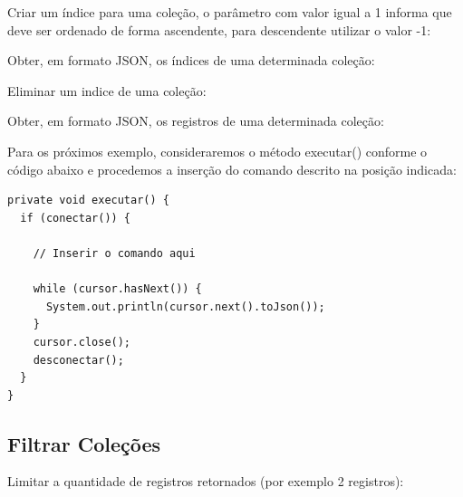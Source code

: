 \documentclass[a4paper,11pt]{article}
\begin{document}
Criar um índice para uma coleção, o parâmetro com valor igual a 1 informa que deve ser ordenado de forma ascendente, para descendente utilizar o valor -1: \\

Obter, em formato JSON, os índices de uma determinada coleção: \\

Eliminar um indice de uma coleção: \\

Obter, em formato JSON, os registros de uma determinada coleção: \\

Para os próximos exemplo, consideraremos o método executar() conforme o código abaixo e procedemos a inserção do comando descrito na posição indicada:
\begin{lstlisting}
private void executar() {
  if (conectar()) {

    // Inserir o comando aqui
    
    while (cursor.hasNext()) {
      System.out.println(cursor.next().toJson());
    }
    cursor.close();  
    desconectar();
  }
}
\end{lstlisting}

\subsection{Filtrar Coleções}
Limitar a quantidade de registros retornados (por exemplo 2 registros): \\
\end{document}
